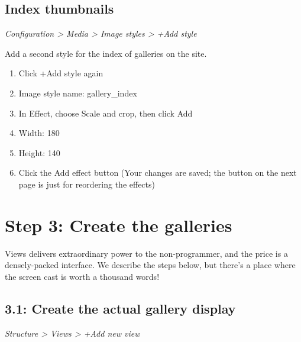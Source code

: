 \documentclass[letterpaper,10pt,english]{sphinxmanual}
\begin{document}
\subsection{Index thumbnails}
\label{recipe:index-thumbnails}
\emph{Configuration \textgreater{} Media \textgreater{} Image styles \textgreater{} +Add style}

Add a second style for the index of galleries on the site.
\begin{enumerate}
\item {} 
Click +Add style again

\item {} 
Image style name: gallery\_index

\item {} 
In Effect, choose Scale and crop, then click Add

\item {} 
Width: 180

\item {} 
Height: 140

\item {} 
Click the Add effect button (Your changes are saved; the button on the next page is just for reordering the effects)

\end{enumerate}


\section{Step 3: Create the galleries}
\label{recipe:step-3-create-the-galleries}
Views delivers extraordinary power to the non-programmer, and the price is a densely-packed interface. We describe the steps below, but there's a place where the screen cast is worth a thousand words!


\subsection{3.1: Create the actual gallery display}
\label{recipe:create-the-actual-gallery-display}
\emph{Structure \textgreater{} Views \textgreater{} +Add new view}
\end{document}
